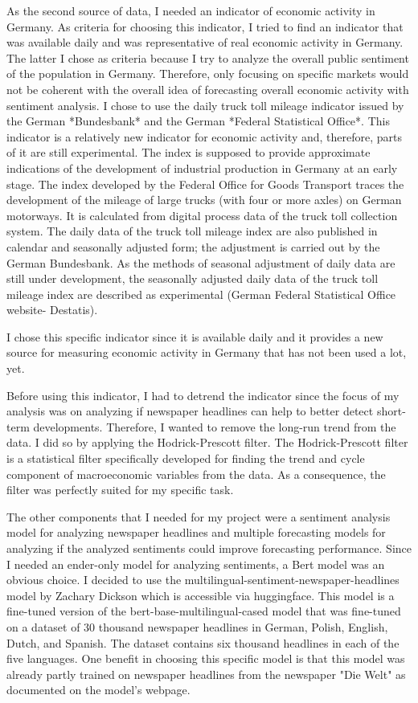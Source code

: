 \documentclass[11pt, a4paper, leqno]{article}
\begin{document}
As the second source of data, I needed an indicator of economic activity in Germany. As criteria for choosing this indicator, I tried to find an indicator that was available daily and was representative of real economic activity in Germany. The latter I chose as criteria because I try to analyze the overall public sentiment of the population in Germany. Therefore, only focusing on specific markets would not be coherent with the overall idea of forecasting overall economic activity with sentiment analysis.
I chose to use the daily truck toll mileage indicator issued by the German *Bundesbank* and the German *Federal Statistical Office*. This indicator is a relatively new indicator for economic activity and, therefore, parts of it are still experimental. The index is supposed to provide approximate indications of the development of industrial production in Germany at an early stage. The index developed by the Federal Office for Goods Transport traces the development of the mileage of large trucks (with four or more axles) on German motorways. It is calculated from digital process data of the truck toll collection system. The daily data of the truck toll mileage index are also published in calendar and seasonally adjusted form; the adjustment is carried out by the German Bundesbank. As the methods of seasonal adjustment of daily data are still under development, the seasonally adjusted daily data of the truck toll mileage index are described as experimental (German Federal Statistical Office website- Destatis).

I chose this specific indicator since it is available daily and it provides a new source for measuring economic activity in Germany that has not been used a lot, yet.

Before using this indicator, I had to detrend the indicator since the focus of my analysis was on analyzing if newspaper headlines can help to better detect short-term developments. Therefore, I wanted to remove the long-run trend from the data. I did so by applying the Hodrick-Prescott filter. The Hodrick-Prescott filter is a statistical filter specifically developed for finding the trend and cycle component of macroeconomic variables from the data. As a consequence, the filter was perfectly suited for my specific task.

The other components that I needed for my project were a sentiment analysis model for analyzing newspaper headlines and multiple forecasting models for analyzing if the analyzed sentiments could improve forecasting performance. Since I needed an ender-only model for analyzing sentiments, a Bert model was an obvious choice. I decided to use the multilingual-sentiment-newspaper-headlines model by Zachary Dickson which is accessible via huggingface. This model is a fine-tuned version of the bert-base-multilingual-cased model that was fine-tuned on a dataset of 30 thousand newspaper headlines in German, Polish, English, Dutch, and Spanish. The dataset contains six thousand headlines in each of the five languages.
One benefit in choosing this specific model is that this model was already partly trained on newspaper headlines from the newspaper "Die Welt" as documented on the model's webpage.
\end{document}
